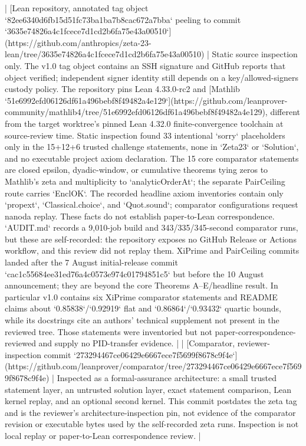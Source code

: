 \documentclass[11pt]{article}
\begin{document}
\begin{markdown}
| [Lean repository, annotated tag object `82ee6340d6fb15d51fc73ba1ba7b8cac672a7bba` peeling to commit `3635e74826a4c1fcece7d1cd2b6fa75e43a00510`](https://github.com/anthropics/zeta-23-lean/tree/3635e74826a4c1fcece7d1cd2b6fa75e43a00510) | Static source inspection only. The v1.0 tag object contains an SSH signature and GitHub reports that object verified; independent signer identity still depends on a key/allowed-signers custody policy. The repository pins Lean 4.33.0-rc2 and [Mathlib `51e6992efd06126df61a496bebf8f49482a4e129`](https://github.com/leanprover-community/mathlib4/tree/51e6992efd06126df61a496bebf8f49482a4e129), different from the target worktree's pinned Lean 4.32.0 finite-convergence toolchain at source-review time. Static inspection found 33 intentional `sorry` placeholders only in the 15+12+6 trusted challenge statements, none in `Zeta23` or `Solution`, and no executable project axiom declaration. The 15 core comparator statements are closed epsilon, dyadic-window, or cumulative theorems tying zeros to Mathlib's zeta and multiplicity to `analyticOrderAt`; the separate PairCeiling route carries `EnclOK`. The recorded headline axiom inventories contain only `propext`, `Classical.choice`, and `Quot.sound`; comparator configurations request nanoda replay. These facts do not establish paper-to-Lean correspondence. `AUDIT.md` records a 9,010-job build and 343/335/345-second comparator runs, but these are self-recorded: the repository exposes no GitHub Release or Actions workflow, and this review did not replay them. XiPrime and PairCeiling commits landed after the 7 August initial-release commit `cac1c55684ee31ed76a4c0573e974c01794851c5` but before the 10 August announcement; they are beyond the core Theorems A--E/headline result. In particular v1.0 contains six XiPrime comparator statements and README claims about `0.85838`/`0.92919` flat and `0.86864`/`0.93432` quartic bounds, while its docstrings cite an authors' technical supplement not present in the reviewed tree. Those statements were inventoried but not paper-correspondence-reviewed and supply no PID-transfer evidence. |
| [Comparator, reviewer-inspection commit `273294467ce06429e6667ece7f5699f8678c9f4e`](https://github.com/leanprover/comparator/tree/273294467ce06429e6667ece7f5699f8678c9f4e) | Inspected as a formal-assurance architecture: a small trusted statement layer, an untrusted solution layer, exact statement comparison, Lean kernel replay, and an optional second kernel. This commit postdates the zeta tag and is the reviewer's architecture-inspection pin, not evidence of the comparator revision or executable bytes used by the self-recorded zeta runs. Inspection is not local replay or paper-to-Lean correspondence review. |


\end{markdown}
\end{document}
